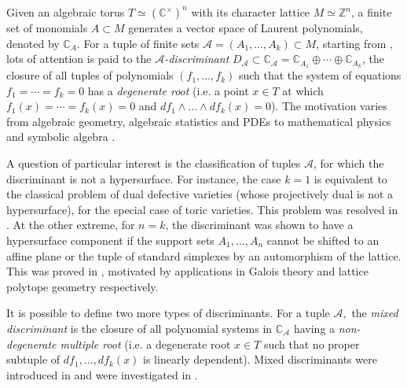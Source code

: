 \documentclass[11pt]{article}
\theoremstyle{plain}
\theoremstyle{definition}
\theoremstyle{remark}
\theoremstyle{plain}
\theoremstyle{plain}
\theoremstyle{plain}
\theoremstyle{definition}
\begin{document}
Given an algebraic torus $T\simeq(\mathbb{C}^{\times})^{n}$ with
its character lattice $M\simeq\mathbb{Z}^{n}$, a finite set of monomials
$A\subset M$ generates a vector space of Laurent polynomials, denoted
by $\mathbb{C}_{A}$. For a tuple of finite sets $\mathscr{A}=(A_{1},\ldots,A_{k})\subset M$,
starting from \cite{gelfand_discriminants_1994}, lots of attention
is paid to the $\mathscr{A}$\textit{-discriminant} $D_{\mathscr{A}}\subset\mathbb{C}_{\mathscr{A}}=\mathbb{C}_{A_{1}}\oplus\cdots\oplus\mathbb{C}_{A_{k}}$,
the closure of all tuples of polynomials $(f_{1},\ldots,f_{k})$ such
that the system of equations $f_{1}=\cdots=f_{k}=0$ has a \textit{degenerate
root} (i.e. a point $x\in T$ at which $f_{1}(x)=\cdots=f_{k}(x)=0$
and $df_{1}\wedge\ldots\wedge df_{k}(x)=0$). The motivation varies
from algebraic geometry, algebraic statistics \cite{huh_likelihood_2014,amendola_maximum_2019}
and PDEs \cite{gelfand_hypergeometric_1989,gelfand_generalized_1990}
to mathematical physics \cite{vanhove_feynman_2019,mizera_landau_2022,matsubara-heo_four_2023}
and symbolic algebra \cite{sturmfels_solving_2002}.

A question of particular interest is the classification of tuples
$\mathscr{A}$, for which the discriminant is not a hypersurface.
For instance, the case $k=1$ is equivalent to the classical problem
of dual defective varieties (whose projectively dual is not a hypersurface),
for the special case of toric varieties. This problem was resolved
in \cite{di_rocco_projective_2006,curran_restriction_2007,dickenstein_tropical_2007,esterov_newton_2010,matsui_geometric_2011,furukawa_combinatorial_2021,cattani_non-splitting_2022}.
At the other extreme, for $n=k$, the discriminant was shown to have
a hypersurface component if the support sets $A_{1},\ldots,A_{n}$
cannot be shifted to an affine plane or the tuple of standard simplexes
by an automorphism of the lattice. This was proved in \cite{esterov_galois_2019,borger_defectivity_2020},
motivated by applications in Galois theory and lattice polytope geometry
respectively.

It is possible to define two more types of discriminants. For a tuple
$\mathscr{A},$ the \textit{mixed discriminant} is the closure of
all polynomial systems in $\mathbb{C}_{\mathscr{A}}$ having a \textit{non-degenerate
multiple root} (i.e. a degenerate root $x\in T$ such that no proper
subtuple of $df_{1},...,df_{k}(x)$ is linearly dependent). Mixed
discriminants were introduced in \cite{cattani_mixed_2013} and were
investigated in \cite{dokken_plane_2014,esterov_galois_2019,dickenstein_iterated_2023}.
\end{document}
